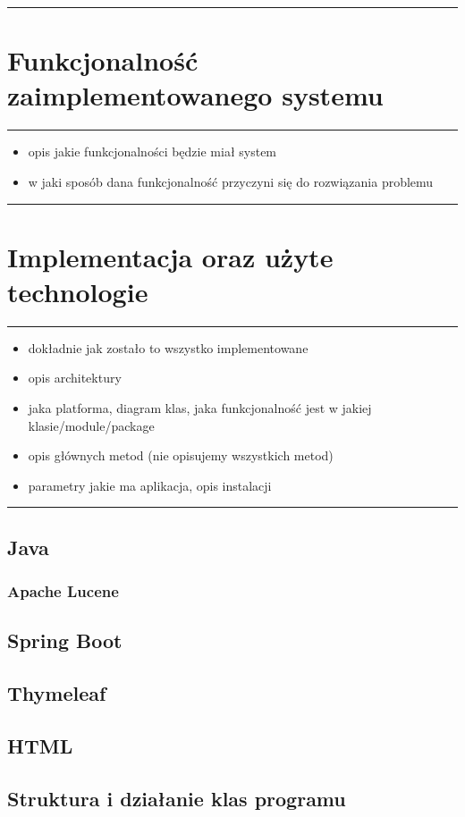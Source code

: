 \documentclass[licencjacka]{pracadypl}
\theoremstyle{definition}
\newcommand{\linia}{\rule{\linewidth}{0.4mm}}
\begin{document}
\linia

\chapter{Funkcjonalność zaimplementowanego systemu}
\linia
\begin{itemize}
	\item opis jakie funkcjonalności będzie miał system
	\item w jaki sposób dana funkcjonalność przyczyni się do rozwiązania problemu
\end{itemize}

\linia

\chapter{Implementacja oraz użyte technologie}
\linia
\begin{itemize}
	\item dokładnie jak zostało to wszystko implementowane
	\item opis architektury
	\item jaka platforma, diagram klas, jaka funkcjonalność jest w jakiej klasie/module/package
	\item opis głównych metod (nie opisujemy wszystkich metod)
	\item parametry jakie ma aplikacja, opis instalacji
\end{itemize}

\linia
\section{Java}
\subsection{Apache Lucene}
\section{Spring Boot}
\section{Thymeleaf}
\section{HTML}
\section{Struktura i działanie klas programu}
\end{document}
